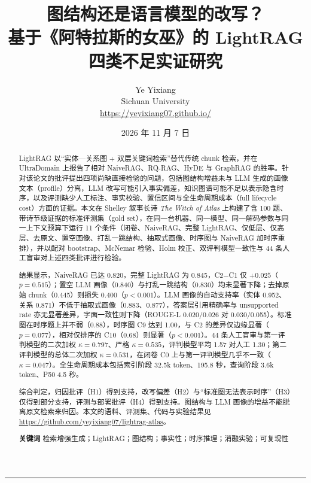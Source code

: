\documentclass[11pt,a4paper]{ctexart}
\title{\vspace{-1.2em}\bfseries 图结构还是语言模型的改写？\\[3pt]
\large 基于《阿特拉斯的女巫》的 LightRAG 四类不足实证研究}
\author{\normalsize Ye Yixiang\\[2pt]
\small Sichuan University\\[2pt]
\small \url{https://yeyixiang07.github.io/}}
\date{\small 2026 年 11 月 7 日}
\begin{document}
\maketitle

\begin{abstract}
\noindent
LightRAG 以“实体—关系图 + 双层关键词检索”替代传统 chunk 检索，并在 UltraDomain 上报告了相对 NaiveRAG、RQ-RAG、HyDE 与 GraphRAG 的胜率。针对该论文的批评提出四项尚缺直接检验的问题，包括图结构增益未与 LLM 生成的画像文本（profile）分离，LLM 改写可能引入事实偏差，知识图谱可能不足以表示隐含时序，以及评测缺少人工标注、事实校验、置信区间与全生命周期成本（full lifecycle cost）方面的证据。本文在 Shelley 叙事长诗 \emph{The Witch of Atlas} 上构建了含 100 题、带诗节级证据的标准评测集（gold set），在同一台机器、同一模型、同一解码参数与同一上下文预算下运行 11 个条件（闭卷、NaiveRAG、完整 LightRAG、仅低层、仅高层、去原文、置空画像、打乱一跳结构、抽取式画像、时序图与 NaiveRAG 加时序重排），并以配对 bootstrap、McNemar 检验、Holm 校正、双评判模型一致性与 44 条人工盲审对上述四类批评进行检验。

结果显示，NaiveRAG 已达 0.820，完整 LightRAG 为 0.845，C2$-$C1 仅 $+0.025$（$p=0.515$）；置空 LLM 画像（0.840）与打乱一跳结构（0.830）均未显著下降；去掉原始 chunk（0.445）则损失 0.400（$p<0.001$）。LLM 画像的自动支持率（实体 0.952、关系 0.871）不低于抽取式画像（0.883、0.877），答案层引用精确率与 unsupported rate 亦无显著差异，字面一致性则下降（ROUGE-L 0.020/0.026 对 0.030/0.055）。标准图在时序题上并不弱（0.88），时序图 C9 达到 1.00，与 C2 的差异仅边缘显著（$p=0.077$），相对仅排序的 C10（0.68）则显著（$p<0.001$）。44 条人工盲审与第一评判模型的二次加权 $\kappa=0.797$、严格 $\kappa=0.535$，评判模型平均 1.57 对人工 1.30；第二评判模型的总体二次加权 $\kappa=0.531$，在闭卷 C0 上与第一评判模型几乎不一致（$\kappa=0.047$）。全生命周期成本包括索引阶段 32.5k token、195.8 秒，查询阶段 3.6k token、P50 4.5 秒。

综合判定，归因批评（H1）得到支持，改写偏差（H2）与“标准图无法表示时序”（H3）仅得到部分支持，评测与部署批评（H4）得到支持。图结构与 LLM 画像的增益不能脱离原文检索来归因。本文的语料、评测集、代码与实验结果见 \url{https://github.com/yeyixiang07/lightrag-atlas}。

\vspace{4pt}
\noindent\textbf{关键词} 检索增强生成；LightRAG；图结构；事实性；时序推理；消融实验；可复现性
\end{abstract}

\vspace{-2pt}
\noindent\rule{\textwidth}{0.4pt}
\end{document}
